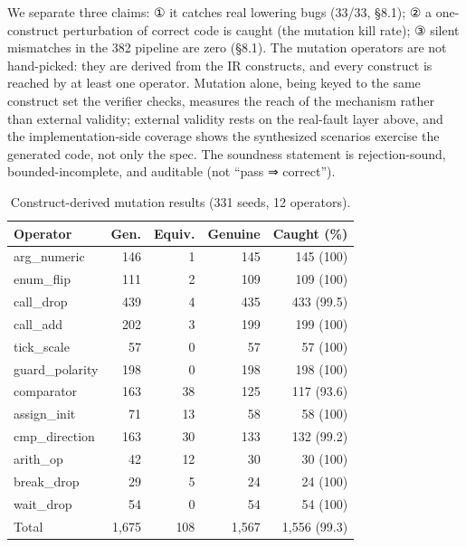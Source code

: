 \documentclass[sigconf,nonacm,anonymous,review]{acmart}
\begin{document}
We separate three claims: ① it catches real lowering bugs (33/33, \S8.1); ② a one-construct perturbation of correct code is caught (the mutation kill rate); ③ silent mismatches in the 382 pipeline are zero (\S8.1). The mutation operators are not hand-picked: they are derived from the IR constructs, and every construct is reached by at least one operator. Mutation alone, being keyed to the same construct set the verifier checks, measures the reach of the mechanism rather than external validity; external validity rests on the real-fault layer above, and the implementation-side coverage shows the synthesized scenarios exercise the generated code, not only the spec. The soundness statement is rejection-sound, bounded-incomplete, and auditable (not ``pass ⇒ correct'').

\begin{table}[t]
\centering
\caption{Construct-derived mutation results (331 seeds, 12 operators).}
\label{tab:mutation}
\small
\setlength{\tabcolsep}{4.5pt}
\begin{tabular}{lrrrr}
\toprule
Operator & Gen. & Equiv. & Genuine & Caught (\%) \\
\midrule
arg\_numeric    & 146 & 1  & 145 & 145 (100) \\
enum\_flip      & 111 & 2  & 109 & 109 (100) \\
call\_drop      & 439 & 4  & 435 & 433 (99.5) \\
call\_add       & 202 & 3  & 199 & 199 (100) \\
tick\_scale     & 57  & 0  & 57  & 57 (100) \\
guard\_polarity & 198 & 0  & 198 & 198 (100) \\
comparator      & 163 & 38 & 125 & 117 (93.6) \\
assign\_init    & 71  & 13 & 58  & 58 (100) \\
cmp\_direction  & 163 & 30 & 133 & 132 (99.2) \\
arith\_op       & 42  & 12 & 30  & 30 (100) \\
break\_drop     & 29  & 5  & 24  & 24 (100) \\
wait\_drop      & 54  & 0  & 54  & 54 (100) \\
\midrule
Total           & 1,675 & 108 & 1,567 & 1,556 (99.3) \\
\bottomrule
\end{tabular}
\end{table}
\end{document}
